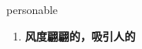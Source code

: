 
\begin{frame}
{\huge personable}
\begin{center}
\begin{enumerate}\Large
  \item \textbf{风度翩翩的，吸引人的}
\end{enumerate}
\end{center}
\end{frame}
